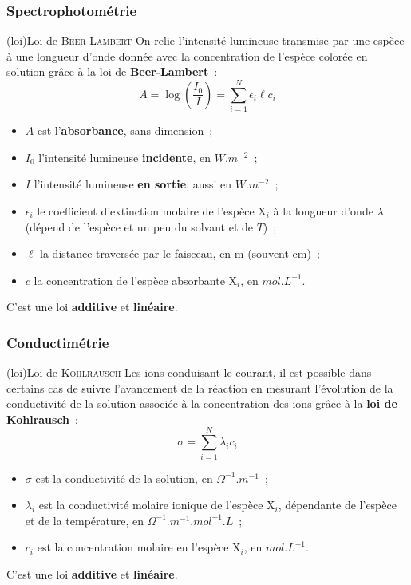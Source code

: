 \documentclass[../../main/main.tex]{subfiles}
\begin{document}
\subsubsection{Spectrophotométrie}
\begin{tcb}[label=loi:berrlambert](loi){Loi de \textsc{Beer-Lambert}}
	On relie l'intensité lumineuse transmise par une espèce à une longueur
	d'onde donnée avec la concentration de l'espèce colorée en solution grâce à
	la loi de \textbf{Beer-Lambert}~:
	\[
		\boxed{
			A = \log \left( \frac{I_0}{I} \right) = \sum_{i=1}^{N}\epsilon_i
			\ell c_i
		}%
	\]
	\begin{itemize}
		\item $A$ est l'\textbf{absorbance}, sans dimension~;
		\item $I_0$ l'intensité lumineuse \textbf{incidente}, en $\si{W.m^{-2}}$~;
		\item $I$ l'intensité lumineuse \textbf{en sortie}, aussi en
		      $\si{W.m^{-2}}$~;
		\item $\epsilon_i$ le coefficient d'extinction molaire de l'espèce X$_i$
		      à la longueur d'onde $\lambda$ (dépend de l'espèce et un peu du
		      solvant et de $T$)~;
		\item $\ell$ la distance traversée par le faisceau, en \si{m} (souvent
		      \si{cm})~;
		\item $c$ la concentration de l'espèce absorbante X$_i$, en
		      $\si{mol.L^{-1}}$.
	\end{itemize}
	\begin{center}
		C'est une loi \textbf{additive} et \textbf{linéaire}.
	\end{center}
\end{tcb}

\subsubsection{Conductimétrie}
\begin{tcb}[label=loi:kohlrausch](loi){Loi de \textsc{Kohlrausch}}
	Les ions conduisant le courant, il est possible dans certains cas de suivre
	l'avancement de la réaction en mesurant l'évolution de la conductivité de la
	solution associée à la concentration des ions grâce à la \textbf{loi de
		Kohlrausch}~:
	\[\boxed{\sigma = \sum_{i=1}^{N}\lambda_ic_i}\]
	\begin{itemize}
		\item $\sigma$ est la conductivité de la solution, en
		      $\si{\Omega^{-1}.m^{-1}}$~;
		\item $\lambda_i$ est la conductivité molaire ionique de l'espèce X$_i$,
		      dépendante de l'espèce et de la température, en
		      $\si{\Omega^{-1}.m^{-1}.mol^{-1}.L}$~;
		\item $c_i$ est la concentration molaire en l'espèce X$_i$, en
		      $\si{mol.L^{-1}}$.
	\end{itemize}
	\begin{center}
		C'est une loi \textbf{additive} et \textbf{linéaire}.
	\end{center}
\end{tcb}
\end{document}
